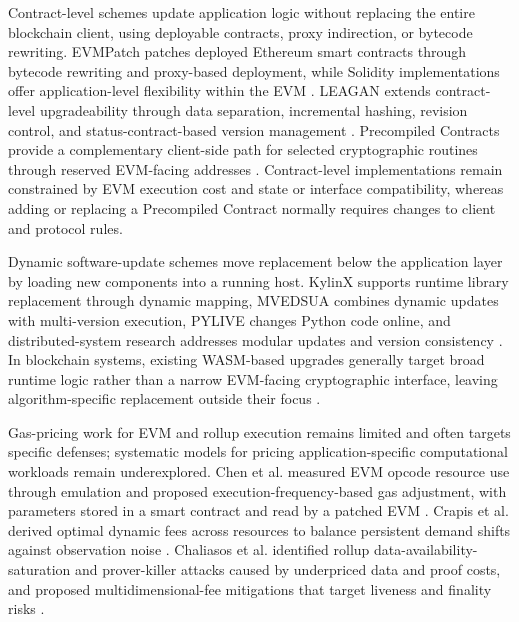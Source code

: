 \documentclass[runningheads]{llncs}
\begin{document}
Contract-level schemes update application logic without replacing the entire blockchain client, using deployable contracts, proxy indirection, or bytecode rewriting. EVMPatch patches deployed Ethereum smart contracts through bytecode rewriting and proxy-based deployment, while Solidity implementations offer application-level flexibility within the EVM \cite{rodler2021evmpatch,ethereumEVM}. LEAGAN extends contract-level upgradeability through data separation, incremental hashing, revision control, and status-contract-based version management \cite{kumar2025leagan}. Precompiled Contracts provide a complementary client-side path for selected cryptographic routines through reserved EVM-facing addresses \cite{evmCodesPrecompiled,eip196,eip197}. Contract-level implementations remain constrained by EVM execution cost and state or interface compatibility, whereas adding or replacing a Precompiled Contract normally requires changes to client and protocol rules.

Dynamic software-update schemes move replacement below the application layer by loading new components into a running host. KylinX supports runtime library replacement through dynamic mapping, MVEDSUA combines dynamic updates with multi-version execution, PYLIVE changes Python code online, and distributed-system research addresses modular updates and version consistency \cite{zhang2018kylinx,pina2019mvedsua,huang2021pylive,ajmani2006modular,baresi2017versionConsistency}. In blockchain systems, existing WASM-based upgrades generally target broad runtime logic rather than a narrow EVM-facing cryptographic interface, leaving algorithm-specific replacement outside their focus \cite{webassemblyCoreSpec,polkadotRuntimeUpgrades}.

Gas-pricing work for EVM and rollup execution remains limited and often targets specific defenses; systematic models for pricing application-specific computational workloads remain underexplored. Chen et al. measured EVM opcode resource use through emulation and proposed execution-frequency-based gas adjustment, with parameters stored in a smart contract and read by a patched EVM \cite{chenAdaptiveGas}. Crapis et al. derived optimal dynamic fees across resources to balance persistent demand shifts against observation noise \cite{crapisDynamicFees}. Chaliasos et al. identified rollup data-availability-saturation and prover-killer attacks caused by underpriced data and proof costs, and proposed multidimensional-fee mitigations that target liveness and finality risks \cite{chaliasosRollups}.
\end{document}
